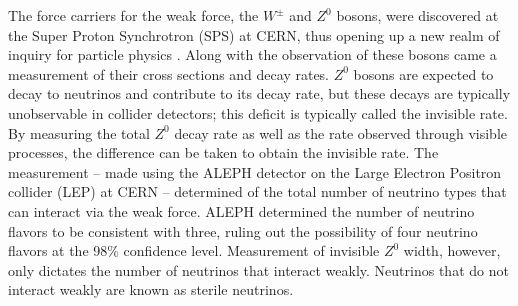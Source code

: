 The force carriers for the weak force, the $W^\pm$ and $Z^0$ bosons, were
discovered at the Super Proton Synchrotron (SPS) at CERN, thus opening up a new
realm of inquiry for particle physics \cite{wBoson, zBoson}.  Along with the
observation of these bosons came a measurement of their cross sections and
decay rates.  $Z^0$ bosons are expected to decay to neutrinos and contribute to
its decay rate, but these decays are typically unobservable in collider
detectors; this deficit is typically called the invisible rate.  By measuring
the total $Z^0$ decay rate as well as the rate observed through visible
processes, the difference can be taken to obtain the invisible rate.  The
measurement -- made using the ALEPH detector on the Large Electron Positron
collider (LEP) at CERN -- determined of the total number of neutrino types that
can interact via the weak force.  ALEPH determined the number of neutrino
flavors to be consistent with three, ruling out the possibility of four
neutrino flavors at the 98\% confidence level.  \cite{aleph}  Measurement of
invisible $Z^0$ width, however, only dictates the number of neutrinos that
interact weakly.  Neutrinos that do not interact weakly are known as sterile
neutrinos.

